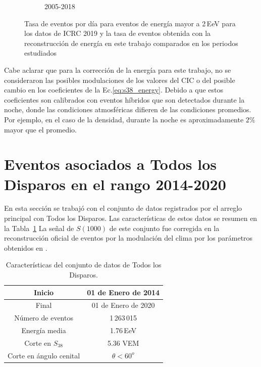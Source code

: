 \begin{figure}[H]
\begin{subfigure}[b]{0.5\textwidth}
                \caption{2005-2018}\label{fig:2EeV_expected_05_18}
                \end{subfigure}%
                \caption{Tasa de eventos por día para eventos de energía mayor a 2\,EeV para los datos de ICRC 2019 y la tasa de eventos obtenida con la reconstrucción de energía en este trabajo comparados en los periodos estudiados}\label{final}
        \end{figure}
Cabe aclarar que para la corrección de la energía para este trabajo, no se consideraron las posibles modulaciones de los valores del CIC o del posible cambio en los coeficientes de la Ec.\ref{eq:s38_energy}. Debido a que estos coeficientes son calibrados con eventos híbridos que son detectados durante la noche, donde las condiciones atmosféricas difieren de las condiciones promedios. Por ejemplo, en el caso de la densidad, durante la noche es aproximadamente $2\%$ mayor que el promedio.


\section{Eventos asociados a Todos los Disparos en el rango 2014-2020 }	\label{ALL_modulacion}
	

En esta sección se trabajó con el conjunto de datos registrados por el arreglo principal con Todos los Disparos. Las características de estos datos se resumen en la Tabla~\ref{tabla:caracteristicas_ALL} La señal de $S(1000)$ de este conjunto fue corregida en la reconstrucción oficial de eventos por la modulación del clima por los parámetros obtenidos en \cite{aab2017impact}.

\begin{table}[H]
  \centering
  \begin{tabular}{|c|c|}
  \hline
  Inicio              & 01  de Enero de 2014\\ \hline
  Final               & 01  de Enero de 2020       							\\ \hline
  Número de eventos   & 1\,263\,015							\\ \hline 
  Energía media       & 1.76\,EeV       				\\ \hline  %
  Corte en $S_{38}$   & 5.36 VEM        				\\ \hline 
  Corte en ángulo cenital		  & $\theta < 60^o$ 				\\ \hline
  \end{tabular}
\caption{Características del conjunto de datos de Todos los Disparos.} \label{tabla:caracteristicas_ALL}
\end{table}



